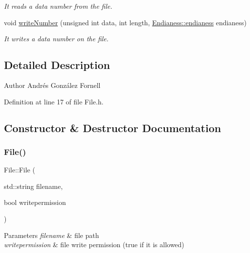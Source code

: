 \begin{DoxyCompactItemize}
\begin{DoxyCompactList}\small\item\em It reads a data number from the file. \end{DoxyCompactList}\item 
void \hyperlink{class_file_a75a4a4b828576e6912f75e22a7250e92}{write\+Number} (unsigned int data, int length, \hyperlink{struct_file_1_1_endianess_ac80818ac42fdd0c9aa29d424e65fa37e}{Endianess\+::endianess} endianess)
\begin{DoxyCompactList}\small\item\em It writes a data number on the file. \end{DoxyCompactList}\end{DoxyCompactItemize}


\subsection{Detailed Description}
\begin{DoxyAuthor}{Author}
Andrés González Fornell 
\end{DoxyAuthor}


Definition at line 17 of file File.\+h.



\subsection{Constructor \& Destructor Documentation}
\mbox{\label{class_file_a8fedf48254fb2b7087fe82369301f6e6}} 
\subsubsection{\texorpdfstring{File()}{File()}}
{\footnotesize\ttfamily File\+::\+File (\begin{DoxyParamCaption}\item[{std\+::string}]{filename,  }\item[{bool}]{writepermission }\end{DoxyParamCaption})}


\begin{DoxyParams}{Parameters}
{\em filename} & file path \\
\hline
{\em writepermission} & file write permission (true if it is allowed) \\
\hline
\end{DoxyParams}


